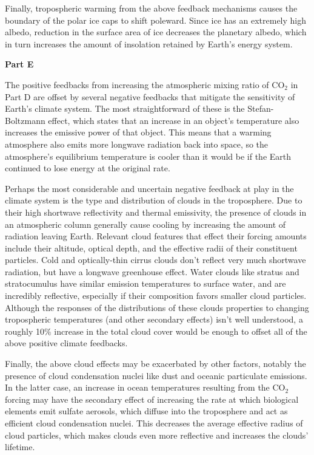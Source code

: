 \documentclass[12pt]{article}
\begin{document}
Finally, tropospheric warming from the above feedback mechanisms causes the boundary of the polar ice caps to shift poleward. Since ice has an extremely high albedo, reduction in the surface area of ice decreases the planetary albedo, which in turn increases the amount of insolation retained by Earth's energy system.

\vspace{2em}\noindent\textbf{Part E}

The positive feedbacks from increasing the atmospheric mixing ratio of CO$_2$ in Part D are offset by several negative feedbacks that mitigate the sensitivity of Earth's climate system. The most straightforward of these is the Stefan-Boltzmann effect, which states that an increase in an object's temperature also increases the emissive power of that object. This means that a warming atmosphere also emits more longwave radiation back into space, so the atmosphere's equilibrium temperature is cooler than it would be if the Earth continued to lose energy at the original rate.

Perhaps the most considerable and uncertain negative feedback at play in the climate system is the type and distribution of clouds in the troposphere. Due to their high shortwave reflectivity and thermal emissivity, the presence of clouds in an atmospheric column generally cause cooling by increasing the amount of radiation leaving Earth. Relevant cloud features that effect their forcing amounts include their altitude, optical depth, and the effective radii of their constituent particles. Cold and optically-thin cirrus clouds don't reflect very much shortwave radiation, but have a longwave greenhouse effect. Water clouds like stratus and stratocumulus have similar emission temperatures to surface water, and are incredibly reflective, especially if their composition favors smaller cloud particles. Although the responses of the distributions of these clouds properties to changing tropospheric temperatures (and other secondary effects) isn't well understood, a roughly 10$\%$ increase in the total cloud cover would be enough to offset all of the above positive climate feedbacks.

Finally, the above cloud effects may be exacerbated by other factors, notably the presence of cloud condensation nuclei like dust and oceanic particulate emissions. In the latter case, an increase in ocean temperatures resulting from the CO$_2$ forcing may have the secondary effect of increasing the rate at which biological elements emit sulfate aerosols, which diffuse into the troposphere and act as efficient cloud condensation nuclei. This decreases the average effective radius of cloud particles, which makes clouds even more reflective and increases the clouds' lifetime.
\end{document}
